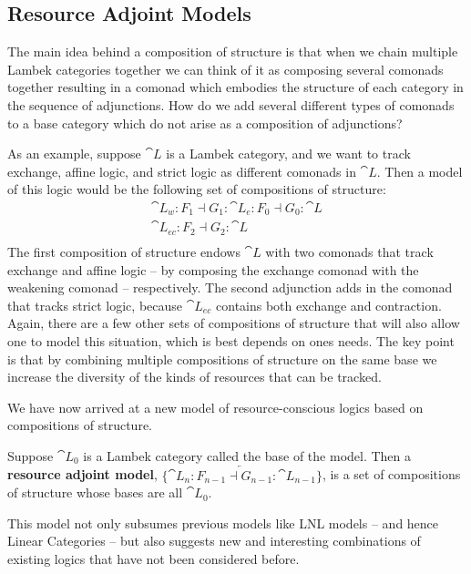 \subsection{Resource Adjoint Models}
\label{subsec:resource_adjoint_models}

The main idea behind a composition of structure is that when we
chain multiple Lambek categories together we can think of it as
composing several comonads together resulting in a comonad which
embodies the structure of each category in the sequence of
adjunctions.  How do we add several different types of
comonads to a base category which do not arise as a composition of
adjunctions?

As an example, suppose $\cat{L}$ is a Lambek category, and we want to
track exchange, affine logic, and strict logic as different comonads
in $\cat{L}$.  Then a model of this logic would be the following set
of compositions of structure:
\[
\begin{array}{lll}
  \cat{L}_w : F_1 \dashv G_1 : \cat{L}_e : F_0 \dashv G_0 : \cat{L}\\
  \cat{L}_{ec} : F_2 \dashv G_2 : \cat{L}\\
\end{array}
\]
The first composition of structure endows $\cat{L}$ with two comonads
that track exchange and affine logic -- by composing the exchange
comonad with the weakening comonad -- respectively.  The second
adjunction adds in the comonad that tracks strict logic, because
$\cat{L}_{ec}$ contains both exchange and contraction.  Again, there
are a few other sets of compositions of structure that will also allow
one to model this situation, which is best depends on ones needs.  The
key point is that by combining multiple compositions of structure on
the same base we increase the diversity of the kinds of resources that
can be tracked.

We have now arrived at a new model of resource-conscious logics based
on compositions of structure.
\begin{definition}
  \label{def:resource-adjoint-model}
  Suppose $\cat{L}_0$ is a Lambek category called the base of the
  model.  Then a \textbf{resource adjoint model},
  $\{\overleftarrow{\cat{L}_n : F_{n-1} \dashv G_{n-1} : \cat{L}_{n-1}}\}$,
  is a set of compositions of structure whose bases are all $\cat{L}_0$.
\end{definition}


This model not only subsumes previous models like LNL models -- and
hence Linear Categories -- but also suggests new and interesting
combinations of existing logics that have not been considered before.

